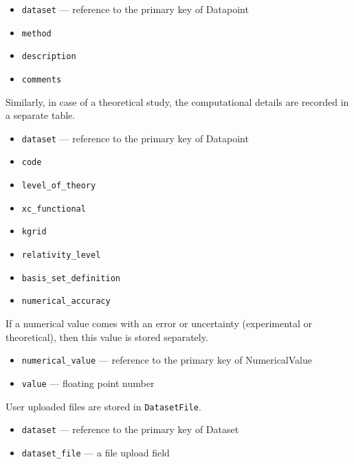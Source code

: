 \documentclass{article}
\begin{document}
\begin{tcolorbox}[colback=green!5,colframe=green!40!black,title=ExperimentalDetails(Base)]
  \begin{itemize}
  \item \texttt{dataset} --- reference to the primary key of Datapoint
  \item \texttt{method}
  \item \texttt{description}
  \item \texttt{comments}
  \end{itemize}
\end{tcolorbox}

Similarly, in case of a theoretical study, the computational details are recorded in a separate table.
\begin{tcolorbox}[colback=green!5,colframe=green!40!black,title=ComputationalDetails(Base)]
  \begin{itemize}
  \item \texttt{dataset} --- reference to the primary key of Datapoint
  \item \texttt{code}
  \item \texttt{level\_of\_theory}
  \item \texttt{xc\_functional}
  \item \texttt{kgrid}
  \item \texttt{relativity\_level}
  \item \texttt{basis\_set\_definition}
  \item \texttt{numerical\_accuracy}
  \end{itemize}
\end{tcolorbox}

If a numerical value comes with an error or uncertainty (experimental or theoretical), then this value is stored separately.
\begin{tcolorbox}[colback=green!5,colframe=green!40!black,title=Error(Base)]
  \begin{itemize}
  \item \texttt{numerical\_value} --- reference to the primary key of NumericalValue
  \item \texttt{value} --- floating point number
  \end{itemize}
\end{tcolorbox}

User uploaded files are stored in \texttt{DatasetFile}.
\begin{tcolorbox}[colback=green!5,colframe=green!40!black,title=DatasetFile(Base)]
  \begin{itemize}
  \item \texttt{dataset} --- reference to the primary key of Dataset
  \item \texttt{dataset\_file} --- a file upload field
  \end{itemize}
\end{tcolorbox}
\end{document}
